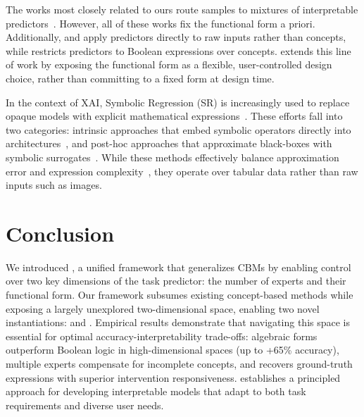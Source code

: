 \documentclass{article}
\theoremstyle{plain}
\theoremstyle{definition}
\theoremstyle{remark}
\begin{document}
The works most closely related to ours route samples to mixtures of interpretable predictors~\citep{pradier2021preferential,ismailinterpretable,debot2024interpretable}. However, all of these works fix the functional form a priori. Additionally, \citet{pradier2021preferential} and \citet{ismailinterpretable} apply predictors directly to raw inputs rather than concepts, while \citet{debot2024interpretable} restricts predictors to Boolean expressions over concepts. \classacro{} extends this line of work by exposing the functional form as a flexible, user-controlled design choice, rather than committing to a fixed form at design time.

In the context of XAI, Symbolic Regression (SR) is increasingly used to replace opaque models with explicit mathematical expressions~\citep{dong2025recent}. These efforts fall into two categories: intrinsic approaches that embed symbolic operators directly into architectures~\citep{sahoo2018learning, biggio2021neural}, and post-hoc approaches that approximate black-boxes with symbolic surrogates~\citep{alaa2019demystifying, bendinelli2023controllable}. While these methods effectively balance approximation error and expression complexity~\citep{langley1979rediscovering, langley1981bacon, koza1994genetic}, they operate over tabular data rather than raw inputs such as images.


\section{Conclusion}

We introduced \classacro{}, a unified framework that generalizes CBMs by enabling control over two key dimensions of the task predictor: the number of experts and their functional form. Our framework subsumes existing concept-based methods while exposing a largely unexplored two-dimensional space, enabling two novel instantiations: \linear{} and \symbolic{}. Empirical results demonstrate that navigating this space is essential for optimal accuracy-interpretability trade-offs: algebraic forms outperform Boolean logic in high-dimensional spaces (up to +65\% accuracy), multiple experts compensate for incomplete concepts, and \symbolicacro{} recovers ground-truth expressions with superior intervention responsiveness. \classacro{} establishes a principled approach for developing interpretable models that adapt to both task requirements and diverse user needs.
\end{document}
